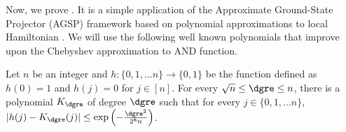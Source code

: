 \documentclass{toc}
\begin{document}
Now, we prove . It is a simple application of the Approximate Ground-State Projector (AGSP) framework based on polynomial approximations to local Hamiltonian \cite{AradKLV13}. We will use the following well known polynomials that improve upon the Chebyshev approximation to AND function.

\begin{fact}
\label{fact:KLS} Let $n$ be an integer and $h:\{0,1,\ldots n\}\rightarrow \{0,1\}$ be the function defined as $h(0)=1$ and $h(j)=0$ for $j\in [n]$. For every $\sqrt{n}\leq \dgre \leq n$, there is a polynomial $K_{\dgre}$ of degree $\dgre$ such that for every $j\in \{0,1,\ldots n\}$,  $|h(j)-K_{\dgre}(j)|\leq \exp\left(-\frac{\dgre^2}{2^8n}\right)$.
\end{fact}
\end{document}
